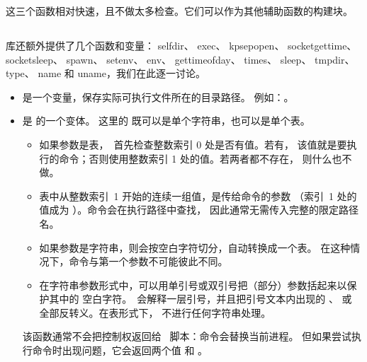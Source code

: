 这三个函数相对快速，且不做太多检查。它们可以作为其他辅助函数的构建块。

\subsection{}

 库还额外提供了几个函数和变量： {selfdir}、
 {exec}、 {kpsepopen}、
 {socketgettime}、 {socketsleep}、
 {spawn}、 {setenv}、
 {env}、 {gettimeofday}、 {times}、
 {sleep}、 {tmpdir}、 {type}、
 {name} 和  {uname}，我们在此逐一讨论。

\begin{itemize}\item {} 是一个变量，保存实际可执行文件所在的目录路径。
    例如：。

\item {} 是  的一个变体。
    这里的  既可以是单个字符串，也可以是单个表。

    \begin{itemize}\item 如果参数是表，\LUATEX\ 首先检查整数索引 0 处是否有值。若有，
        该值就是要执行的命令；否则使用整数索引 1 处的值。若两者都不存在，
        则什么也不做。
    

    \item 表中从整数索引~1 开始的连续一组值，是传给命令的参数
        （索引~1 处的值成为 ）。命令会在执行路径中查找，
        因此通常无需传入完整的限定路径名。
    

    \item 如果参数是字符串，则会按空白字符切分，自动转换成一个表。
        在这种情况下，命令与第一个参数不可能彼此不同。
    

    \item 在字符串参数形式中，可以用单引号或双引号把（部分）参数括起来以保护其中的
        空白字符。\LUATEX\ 会解释一层引号，并且把引号文本内出现的
        \type {\"}、\type {\'} 或 \type {\\} 全部反转义。在表形式下，
        不进行任何字符串处理。
    

    \end{itemize}

    该函数通常不会把控制权返回给 \LUA\ 脚本：命令会替换当前进程。
    但如果尝试执行命令时出现问题，它会返回两个值  和 。


\end{itemize}
